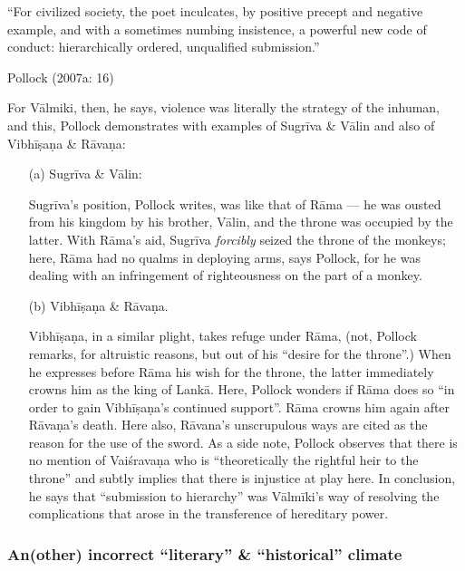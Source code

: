 \begin{myquote}
“For civilized society, the poet inculcates, by positive precept and negative example, and with a sometimes numbing insistence, a powerful new code of conduct: hierarchically ordered, unqualified submission.''

\hfill Pollock (2007a: 16)
\end{myquote}

For Vālmiki, then, he says, violence was literally the strategy of the inhuman, and this, Pollock demonstrates with examples of Sugrīva \& Vālin and also of Vibhīṣaṇa \& Rāvaṇa: 
\begin{itemize}
\item[(a)] Sugrīva \& Vālin:

Sugrīva’s position, Pollock writes, was like that of Rāma --- he was ousted from his kingdom by his brother, Vālin, and the throne was occupied by the latter. With Rāma’s aid, Sugrīva {\sl forcibly} seized the throne of the monkeys; here, Rāma had no qualms in deploying arms, says Pollock, for he was dealing with an infringement of righteousness on the part of a monkey. 

\item[(b)] Vibhīṣaṇa \& Rāvaṇa. 

Vibhīṣaṇa, in a similar plight, takes refuge under Rāma, (not, Pollock remarks, for altruistic reasons, but out of his “desire for the throne”.) When he expresses before Rāma his wish for the throne, the latter immediately crowns him as the king of Lankā. Here, Pollock wonders if Rāma does so “in order to gain Vibhīṣaṇa’s continued support”. Rāma crowns him again after Rāvaṇa’s death. Here also, Rāvana’s unscrupulous ways are cited as the reason for the use of the sword. As a side note, Pollock observes that there is no mention of Vaiśravaṇa who is “theoretically the rightful heir to the throne” and subtly implies that there is injustice at play here. In conclusion, he says that “submission to hierarchy” was Vālmīki’s way of resolving the complications that arose in the transference of hereditary power. 
\end{itemize}

\subsubsection{An(other) incorrect “literary” \& “historical” climate}\label{sec1.2.3.1}

